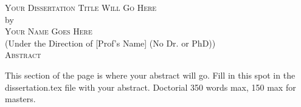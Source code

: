 \documentclass[12pt, notitlepage]{report} %
\begin{document}

\newcommand{\doctitle}{Your Dissertation Title Will Go Here}
\newcommand{\docauthor}{Your Name Goes Here}






\newpage

\thispagestyle{empty}
\vspace*{18pt}
\begin{center}
  \textsc{\Large{\doctitle}}\\[18pt]  %
  by\\[18pt]
  \textsc{\Large\docauthor}\\[12pt]
  (Under the Direction of [Prof's Name] (No Dr. or PhD))\\[12pt]
  \textsc{Abstract}
\end{center}

This section of the page is where your abstract will go. Fill in this spot in the dissertation.tex file with your abstract. Doctorial 350 words max, 150 max for masters.

\thispagestyle{empty}

\begin{list}{\textsc{Index words:\hfill}}{\leftmargin 1.4in}
  \item \begin{flushleft}
  \end{flushleft}
\end{list}
\end{document}
